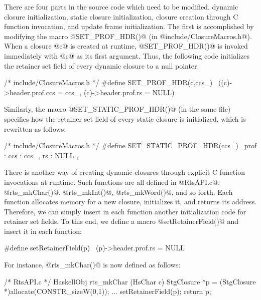 \documentclass{article}
\begin{document}
There are four parts in the source code which need to be modified.
dynamic closure initialization, static closure initialization,  
closure creation through C function invocation,
and update frame initialization.
The first is accomplished by modifying the macro @SET_PROF_HDR()@ (in 
@include/ClosureMacros.h@). When a closure  @c@ is created at runtime, 
@SET_PROF_HDR()@ is invoked immediately with @c@ as its first argument.
Thus, the following code initializes the retainer set field of every
dynamic closure to a null pointer.

\begin{code}
/* include/ClosureMacros.h */
#define SET_PROF_HDR(c,ccs_)            \
        ((c)->header.prof.ccs = ccs_, (c)->header.prof.rs = NULL)
\end{code}

Similarly, the macro @SET_STATIC_PROF_HDR()@ (in the
same file) specifies how the retainer set field of every static closure
is initialized, which is rewritten as follows:

\begin{code}
/* include/ClosureMacros.h */
#define SET_STATIC_PROF_HDR(ccs_)       \
        prof : { ccs : ccs_, rs : NULL },
\end{code}

There is another way of creating dynamic closures through explicit C 
function invocations at runtime. 
Such functions are all defined in @RtsAPI.c@: @rts_mkChar()@, @rts_mkInt()@,
@rts_mkWord()@, and so forth.
Each function allocates memory for a new closure, 
initializes it, and returns its address. 
Therefore, we can simply insert in each function another initialization code 
for retainer set fields.
To this end, we define a macro @setRetainerField()@ and insert it 
in each function:

\begin{code}
#define setRetainerField(p)             \
  (p)->header.prof.rs = NULL
\end{code}

For instance, @rts_mkChar()@ is now defined as follows:

\begin{code}
/* RtsAPI.c */
HaskellObj
rts_mkChar (HsChar c)
{
  StgClosure *p = (StgClosure *)allocate(CONSTR_sizeW(0,1));
  ...
  setRetainerField(p);
  return p;
}
\end{code}
\end{document}
